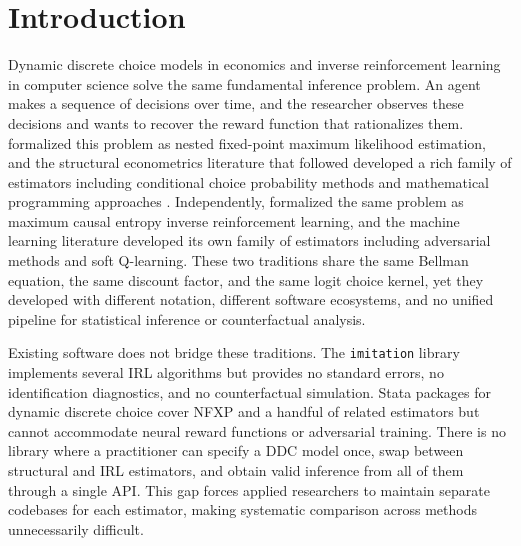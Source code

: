 \section{Introduction}

Dynamic discrete choice models in economics and inverse reinforcement learning in computer science solve the same fundamental inference problem. An agent makes a sequence of decisions over time, and the researcher observes these decisions and wants to recover the reward function that rationalizes them. \citet{rust1987} formalized this problem as nested fixed-point maximum likelihood estimation, and the structural econometrics literature that followed developed a rich family of estimators including conditional choice probability methods and mathematical programming approaches \citep{aguirregabiriaMira2010}. Independently, \citet{ziebart2010} formalized the same problem as maximum causal entropy inverse reinforcement learning, and the machine learning literature developed its own family of estimators including adversarial methods and soft Q-learning. These two traditions share the same Bellman equation, the same discount factor, and the same logit choice kernel, yet they developed with different notation, different software ecosystems, and no unified pipeline for statistical inference or counterfactual analysis.

Existing software does not bridge these traditions. The \texttt{imitation} library \citep{gleave2022} implements several IRL algorithms but provides no standard errors, no identification diagnostics, and no counterfactual simulation. Stata packages for dynamic discrete choice cover NFXP and a handful of related estimators but cannot accommodate neural reward functions or adversarial training. There is no library where a practitioner can specify a DDC model once, swap between structural and IRL estimators, and obtain valid inference from all of them through a single API. This gap forces applied researchers to maintain separate codebases for each estimator, making systematic comparison across methods unnecessarily difficult.

